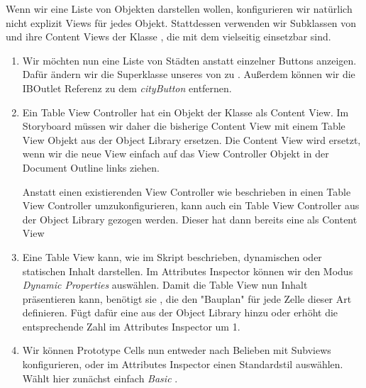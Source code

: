 \documentclass[parskip=half, final]{scrreprt}
\begin{document}
\begin{lecture}
Wenn wir eine Liste von Objekten darstellen wollen, konfigurieren wir natürlich nicht explizit Views für jedes Objekt. Stattdessen verwenden wir Subklassen von  und ihre Content Views der Klasse , die mit dem  vielseitig einsetzbar sind.


\begin{enumerate}

\item Wir möchten nun eine Liste von Städten anstatt einzelner Buttons anzeigen. Dafür ändern wir die Superklasse unseres  von  zu . Außerdem können wir die IBOutlet Referenz zu dem \emph{cityButton} entfernen.

\item Ein Table View Controller hat ein Objekt der  Klasse als Content View. Im Storyboard müssen wir daher die bisherige Content View mit einem Table View Objekt aus der Object Library ersetzen. Die Content View wird ersetzt, wenn wir die neue View einfach auf das View Controller Objekt in der Document Outline links ziehen.

 Anstatt einen existierenden View Controller wie beschrieben in einen Table View Controller umzukonfigurieren, kann auch ein Table View Controller aus der Object Library gezogen werden. Dieser hat dann bereits eine  als Content View

\item Eine Table View kann, wie im Skript beschrieben, dynamischen oder statischen Inhalt darstellen. Im Attributes Inspector können wir den Modus \emph{Dynamic Properties} auswählen. Damit die Table View nun Inhalt präsentieren kann, benötigt sie , die den "{}Bauplan"{} für jede Zelle dieser Art definieren. Fügt dafür eine  aus der Object Library hinzu oder erhöht die entsprechende Zahl im Attributes Inspector um 1.

\item Wir können Prototype Cells nun entweder nach Belieben mit Subviews konfigurieren, oder im Attributes Inspector einen Standardstil auswählen. Wählt hier zunächst einfach \emph{Basic} .



\end{enumerate}
\end{lecture}
\end{document}
